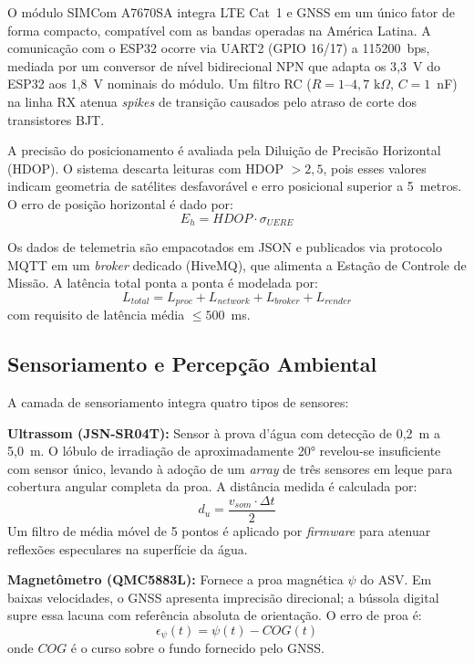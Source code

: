 \documentclass[12pt,a4paper]{article}
\begin{document}
O módulo SIMCom A7670SA integra LTE Cat~1 e GNSS em um único fator de forma compacto, compatível com as bandas operadas na América Latina. A comunicação com o ESP32 ocorre via UART2 (GPIO 16/17) a 115200~bps, mediada por um conversor de nível bidirecional NPN que adapta os 3{,}3~V do ESP32 aos 1{,}8~V nominais do módulo. Um filtro RC ($R = 1$--$4{,}7\text{ k}\Omega$, $C = 1$~nF) na linha RX atenua \textit{spikes} de transição causados pelo atraso de corte dos transistores BJT.

A precisão do posicionamento é avaliada pela Diluição de Precisão Horizontal (HDOP). O sistema descarta leituras com HDOP $> 2{,}5$, pois esses valores indicam geometria de satélites desfavorável e erro posicional superior a 5~metros. O erro de posição horizontal é dado por:
\begin{equation}
E_h = HDOP \cdot \sigma_{UERE}
\end{equation}

Os dados de telemetria são empacotados em JSON e publicados via protocolo MQTT em um \textit{broker} dedicado (HiveMQ), que alimenta a Estação de Controle de Missão. A latência total ponta a ponta é modelada por:
\begin{equation}
L_{total} = L_{proc} + L_{network} + L_{broker} + L_{render}
\end{equation}
com requisito de latência média $\le 500$~ms.

\subsection{Sensoriamento e Percepção Ambiental}

A camada de sensoriamento integra quatro tipos de sensores:

\textbf{Ultrassom (JSN-SR04T):} Sensor à prova d'água com detecção de 0{,}2~m a 5{,}0~m. O lóbulo de irradiação de aproximadamente 20° revelou-se insuficiente com sensor único, levando à adoção de um \textit{array} de três sensores em leque para cobertura angular completa da proa. A distância medida é calculada por:
\begin{equation}
d_u = \frac{v_{som} \cdot \Delta t}{2}
\end{equation}
Um filtro de média móvel de 5 pontos é aplicado por \textit{firmware} para atenuar reflexões especulares na superfície da água.

\textbf{Magnetômetro (QMC5883L):} Fornece a proa magnética $\psi$ do ASV. Em baixas velocidades, o GNSS apresenta imprecisão direcional; a bússola digital supre essa lacuna com referência absoluta de orientação. O erro de proa é:
\begin{equation}
\epsilon_{\psi}(t) = \psi(t) - COG(t)
\end{equation}
onde $COG$ é o curso sobre o fundo fornecido pelo GNSS.
\end{document}
